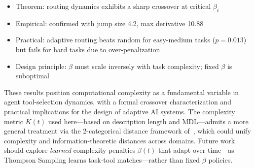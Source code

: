 \documentclass[12pt]{article}
\theoremstyle{definition}
\begin{document}
\begin{itemize}
  \item Theorem: routing dynamics exhibits a sharp crossover at critical $\beta_c$
  \item Empirical: confirmed with jump size 4.2, max derivative 10.88
  \item Practical: adaptive routing beats random for easy-medium tasks ($p=0.013$) but fails for hard tasks due to over-penalization
  \item Design principle: $\beta$ must scale inversely with task complexity; fixed $\beta$ is suboptimal
\end{itemize}

These results position computational complexity as a fundamental variable in agent tool-selection dynamics, with a formal crossover characterization and practical implications for the design of adaptive AI systems. The complexity metric $K(t)$ used here---based on description length and MDL---admits a more general treatment via the 2-categorical distance framework of~\cite{lu2026-distcat}, which could unify complexity and information-theoretic distances across domains. Future work should explore \emph{learned} complexity penalties $\beta(t)$ that adapt over time---as Thompson Sampling learns task-tool matches---rather than fixed $\beta$ policies.
\end{document}
